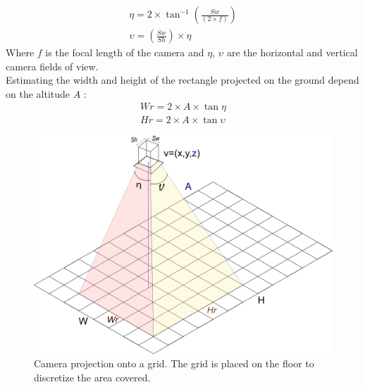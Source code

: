 %
	\begin{equation} \label{eq:etaUpsilon}
 	 \begin{split}
		\eta = 2\times \tan^{-1} (\frac{Sw}{(2\times f)}  ) 
 	   \\
		\upsilon = (\frac{Sw}{Sh} )\times \eta
 	 \end{split}
	\end{equation}
Where $f$ is the focal length of the camera and 
$\eta$, $\upsilon$ are the horizontal and vertical camera fields of view.\\
Estimating the width and height of the rectangle projected on the ground depend on the altitude $A$ :
	\begin{equation}\label{eq:WrHr1}
		\begin{split}
    		Wr= 2\times A\times\tan \eta
    	    \\
    	    Hr= 2\times A\times\tan \upsilon
    	 \end{split}
	\end{equation} 
	\begin{figure}[t!]
		\centering
  		\includegraphics[width=\linewidth]{img/CamProject1Bis.png}
  
 	 	\endminipage\hfill\caption{Camera projection onto a grid. The grid is placed on the floor to discretize 	the area covered.}\label{fig:cam_proj}
	\end{figure}

